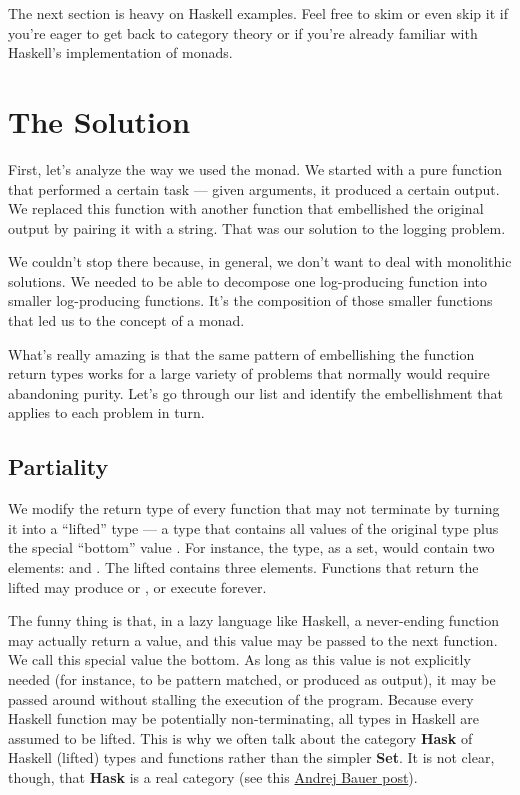 The next section is heavy on Haskell examples. Feel free to skim or even
skip it if you're eager to get back to category theory or if you're
already familiar with Haskell's implementation of monads.

\section{The Solution}\label{the-solution}

First, let's analyze the way we used the  monad. We
started with a pure function that performed a certain task --- given
arguments, it produced a certain output. We replaced this function with
another function that embellished the original output by pairing it with
a string. That was our solution to the logging problem.

We couldn't stop there because, in general, we don't want to deal with
monolithic solutions. We needed to be able to decompose one
log-producing function into smaller log-producing functions. It's the
composition of those smaller functions that led us to the concept of a
monad.

What's really amazing is that the same pattern of embellishing the
function return types works for a large variety of problems that
normally would require abandoning purity. Let's go through our list and
identify the embellishment that applies to each problem in turn.

\subsection{Partiality}\label{partiality}

We modify the return type of every function that may not terminate by
turning it into a ``lifted'' type --- a type that contains all values of
the original type plus the special ``bottom'' value \code{\ensuremath{\bot}}. For
instance, the  type, as a set, would contain two elements:
 and . The lifted  contains
three elements. Functions that return the lifted  may
produce  or , or execute forever.

The funny thing is that, in a lazy language like Haskell, a never-ending
function may actually return a value, and this value may be passed to
the next function. We call this special value the bottom. As long as
this value is not explicitly needed (for instance, to be pattern
matched, or produced as output), it may be passed around without
stalling the execution of the program. Because every Haskell function
may be potentially non-terminating, all types in Haskell are assumed to
be lifted. This is why we often talk about the category \textbf{Hask} of
Haskell (lifted) types and functions rather than the simpler
\textbf{Set}. It is not clear, though, that \textbf{Hask} is a real
category (see this
\href{http://math.andrej.com/2016/08/06/hask-is-not-a-category/}{Andrej
Bauer post}).

